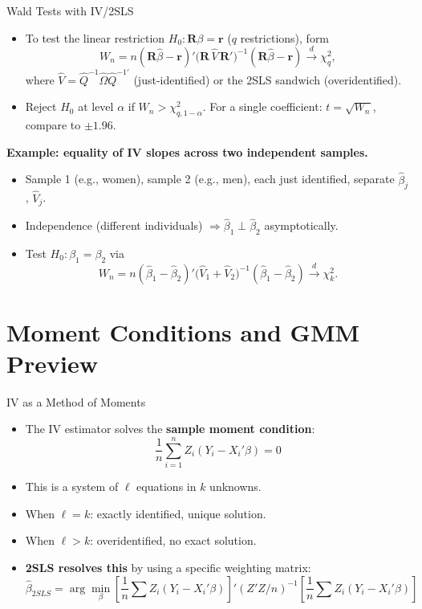 \documentclass[aspectratio=169, handout]{beamer}
\numberwithin{equation}{section}
\begin{document}
\begin{frame}{Wald Tests with IV/2SLS}
\begin{itemize}
\item To test the linear restriction $H_0:\bm{R}\beta=\bm{r}$ ($q$ restrictions), form
$$W_n = n(\bm{R}\hat{\beta}-\bm{r})'\bigl(\bm{R}\,\hat{V}\,\bm{R}'\bigr)^{-1}(\bm{R}\hat{\beta}-\bm{r})\xrightarrow{d}\chi^2_q,$$
where $\hat{V}=\hat{Q}^{-1}\hat{\Omega}\hat{Q}^{-1\prime}$ (just-identified) or the 2SLS sandwich (overidentified).
\item Reject $H_0$ at level $\alpha$ if $W_n>\chi^2_{q,1-\alpha}$.  For a single coefficient: $t=\sqrt{W_n}$, compare to $\pm 1.96$.
\end{itemize}
\medskip
\textbf{Example: equality of IV slopes across two independent samples.}
\begin{itemize}
\item Sample 1 (e.g., women), sample 2 (e.g., men), each just identified, separate $\hat{\beta}_j$, $\hat{V}_j$.
\item Independence (different individuals) $\Rightarrow \hat{\beta}_1\perp\hat{\beta}_2$ asymptotically.
\item Test $H_0:\beta_1=\beta_2$ via
$$W_n = n(\hat{\beta}_1-\hat{\beta}_2)'\bigl(\hat{V}_1+\hat{V}_2\bigr)^{-1}(\hat{\beta}_1-\hat{\beta}_2)\xrightarrow{d}\chi^2_k.$$
\end{itemize}
\end{frame}


\section{Moment Conditions and GMM Preview}

\begin{frame}{IV as a Method of Moments}
\begin{itemize}
\item The IV estimator solves the \textbf{sample moment condition}:
$$\frac{1}{n}\sum_{i=1}^n Z_i(Y_i - X_i'\beta) = 0$$
\item This is a system of $\ell$ equations in $k$ unknowns.
\item When $\ell=k$: exactly identified, unique solution.
\item When $\ell>k$: overidentified, no exact solution.
\item \textbf{2SLS resolves this} by using a specific weighting matrix:
$$\hat{\beta}_{2SLS} = \arg\min_\beta \left[\frac{1}{n}\sum Z_i(Y_i-X_i'\beta)\right]'(Z'Z/n)^{-1}\left[\frac{1}{n}\sum Z_i(Y_i-X_i'\beta)\right]$$
\end{itemize}
\end{frame}
\end{document}
